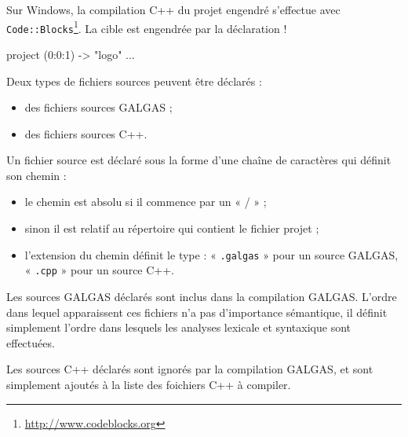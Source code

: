 Sur Windows, la compilation C++ du projet engendré s'effectue avec \texttt{Code::Blocks}\footnote{\url{http://www.codeblocks.org}}. La cible est engendrée par la déclaration \ggs!%

\begin{galgas}
project (0:0:1) -> "logo" {
  ...
}
\end{galgas}






Deux types de fichiers sources peuvent être déclarés :
\begin{itemize}
  \item des fichiers sources GALGAS ;
  \item des fichiers sources C++.
\end{itemize}

Un fichier source est déclaré sous la forme d'une chaîne de caractères qui définit son chemin :
\begin{itemize}
\item le chemin est absolu si il commence par un « / » ;
\item sinon il est relatif au répertoire qui contient le fichier projet ;
\item l'extension du chemin définit le type : « \texttt{.galgas} » pour un source GALGAS, « \texttt{.cpp} » pour un source C++.
\end{itemize}

Les sources GALGAS déclarés sont inclus dans la compilation GALGAS. L'ordre dans lequel apparaissent ces fichiers n'a pas d'importance sémantique, il définit simplement l'ordre dans lesquels les analyses lexicale et syntaxique sont effectuées.

Les sources C++ déclarés sont ignorés par la compilation GALGAS, et sont simplement ajoutés à la liste des foichiers C++ à compiler.



